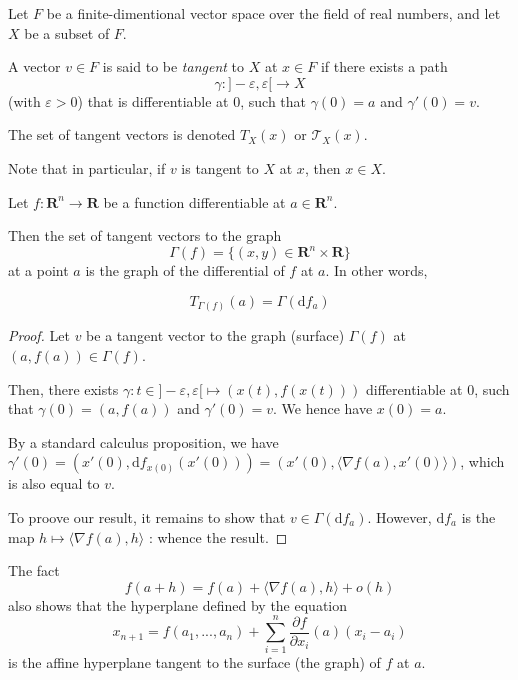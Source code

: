 \begin{definition}
    Let $ F $ be a finite-dimentional vector space over the field of real numbers, and let $ X $ be a subset of $ F $. 

    A vector $ v \in F $ is said to be \textit{tangent} to $ X $ at $ x \in F $ if there exists a path
    \[
        \gamma : ]-\varepsilon, \varepsilon[ \to X
    \]
    (with $ \varepsilon > 0 $) that is differentiable at $ 0 $, such that $ \gamma(0) = a $ and $ \gamma'(0) = v $.

    The set of tangent vectors is denoted $ T_X(x) $ or $ \mathcal T_X(x) $.
\end{definition}

\begin{remark}
    Note that in particular, if $ v $ is tangent to $ X $ at $ x $, then $ x \in X $.
\end{remark}

\begin{proposition}
    Let $ f : \mathbf R^n \to \mathbf R $ be a function differentiable at $ a \in \mathbf R^n $.
    
    Then the set of tangent vectors to the graph
    \[
        \Gamma(f) = \{ (x,y) \in \mathbf R^n \times \mathbf R \}
    \]
    at a point $ a $ is the graph of the differential of $ f $ at $ a $. In other words,

    \[
        T_{\Gamma(f)}(a) = \Gamma(\mathrm d f_a)
    \]
\end{proposition}

\begin{proof}
    Let $ v $ be a tangent vector to the graph (surface) $ \Gamma(f) $ at $ (a, f(a)) \in \Gamma(f) $.

    Then, there exists $ \gamma : t \in ]-\varepsilon, \varepsilon[ \mapsto (x(t), f(x(t))) $ differentiable at $ 0 $, such that $ \gamma(0) = (a,f(a)) $ and $ \gamma'(0) = v $. We hence have $ x(0) = a $.

    By a standard calculus proposition, we have $ \gamma'(0) = (x'(0),\mathrm df_{x(0)}(x'(0))) = (x'(0), \langle \nabla f(a), x'(0) \rangle) $, which is also equal to $ v $.

    To proove our result, it remains to show that $ v \in \Gamma(\mathrm d f_a) $. However, $ \mathrm d f_a $ is the map $ h \mapsto \langle \nabla f(a), h \rangle $ : whence the result.
\end{proof}

\begin{remark}
    The fact
    \[
        f(a+h) = f(a) + \langle \nabla f(a), h \rangle + o(h)
    \]
    also shows that the hyperplane defined by the equation
    \[
        x_{n+1} = f(a_1,...,a_n) + \sum_{i=1}^n \frac{\partial f}{\partial x_i}(a)(x_i-a_i)
    \]
    is the affine hyperplane tangent to the surface (the graph) of $ f $ at $ a $.
\end{remark}